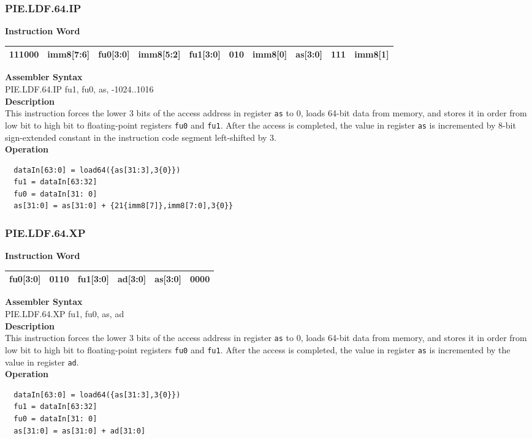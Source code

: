 \newpage
\subsubsection{PIE.LDF.64.IP}\label{instruction:PIELDF64IP}
\setlength\tabcolsep{6pt}
\textbf{Instruction Word} \\
\begin{tabular}{|c|c|c|c|c|c|c|c|c|c|}
	\hline
	111000 & imm8[7:6] & fu0[3:0] & imm8[5:2] & fu1[3:0] & 010 & imm8[0] & as[3:0] & 111 & imm8[1] \\
	\hline
\end{tabular}

\textbf{Assembler Syntax} \\
PIE.LDF.64.IP fu1, fu0, as, -1024..1016 \\
\textbf{Description} \\
This instruction forces the lower 3 bits of the access address in register \lstinline{as} to 0, loads 64-bit data from memory, and stores it in order from low bit to high bit to floating-point registers \lstinline{fu0} and \lstinline{fu1}. After the access is completed, the value in register \lstinline{as} is incremented by 8-bit sign-extended constant in the instruction code segment left-shifted by 3.\\
\textbf{Operation}
\begin{lstlisting}
  dataIn[63:0] = load64({as[31:3],3{0}})
  fu1 = dataIn[63:32]
  fu0 = dataIn[31: 0]
  as[31:0] = as[31:0] + {21{imm8[7]},imm8[7:0],3{0}}
\end{lstlisting}

\newpage
\subsubsection{PIE.LDF.64.XP}\label{instruction:PIELDF64XP}
\setlength\tabcolsep{6pt}
\textbf{Instruction Word} \\
\begin{tabular}{|c|c|c|c|c|c|}
	\hline
	fu0[3:0] & 0110 & fu1[3:0] & ad[3:0] & as[3:0] & 0000 \\
	\hline
\end{tabular}

\textbf{Assembler Syntax} \\
PIE.LDF.64.XP fu1, fu0, as, ad \\
\textbf{Description} \\
This instruction forces the lower 3 bits of the access address in register \lstinline{as} to 0, loads 64-bit data from memory, and stores it in order from low bit to high bit to floating-point registers \lstinline{fu0} and \lstinline{fu1}. After the access is completed, the value in register \lstinline{as} is incremented by the value in register \lstinline{ad}.\\
\textbf{Operation}
\begin{lstlisting}
  dataIn[63:0] = load64({as[31:3],3{0}})
  fu1 = dataIn[63:32]
  fu0 = dataIn[31: 0]
  as[31:0] = as[31:0] + ad[31:0]
\end{lstlisting}

